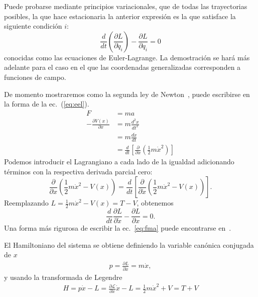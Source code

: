 Puede probarse mediante principios variacionales, que de todas las trayectorias posibles, la que hace  estacionaria la anterior expresi\'on es la que satisface la siguiente condici\'on $i$:
\begin{equation}
  \label{eq:eel}
 \frac{d}{dt} \left ( \frac{\partial L}{\partial\dot{q}_i} \right ) - \frac{\partial L}{\partial q_i} = 0
\end{equation}
conocidas como las ecuaciones de Euler-Lagrange. La demostraci\'on se
har\'a m\'as adelante para el caso en el que las coordenadas generalizadas
corresponden a funciones de campo. 

De momento mostraremos como la segunda ley de Newton~\cite{NewtonSeconLaw}, puede escribirse en la forma de la ec.~(\ref{eq:eel}).
\begin{align}
\label{eq:fma}
  F&=ma\\
  -\frac{\partial V(x)}{\partial x}&=m\frac{d^2x}{dt^2}\nonumber\\
  &=m\frac{d\dot{x}}{dt}\nonumber\\
  &=\frac{d}{dt}
  \left[
    \frac{\partial}{\partial\dot{x}}
    \left(
      \frac{1}{2}m\dot{x}^2
    \right)
  \right]\nonumber
\end{align}
Podemos introducir el Lagrangiano a cada lado de la igualdad adicionando t\'erminos con la respectiva derivada parcial cero:
\begin{equation*}
  \frac{\partial}{\partial x}
  \left(
\frac{1}{2}m\dot{x}^2-V(x)
  \right)=\frac{d}{dt}
  \left[
    \frac{\partial}{\partial\dot{x}}
    \left(
      \frac{1}{2}m\dot{x}^2-V(x)
    \right)
  \right].
\end{equation*}
Reemplazando $L=\frac{1}{2}m\dot{x}^2-V(x)=T-V$, obtenemos
\begin{equation*}
\frac{d}{dt}\frac{\partial L}{\partial\dot{x}}  -\frac{\partial L}{\partial x}=0.
\end{equation*}
Una forma m\'as rigurosa de escribir la ec.~\eqref{eq:fma} puede encontrarse en~\cite{ActionPhysics}. 

El Hamiltoniano del sistema se obtiene definiendo la variable can\'onica conjugada de $x$
\begin{align}
  p=\frac{\partial L}{\partial\dot{x}}=m \dot{x},
\end{align}
y usando la transformada de Legendre
\begin{align}
  H=p \dot{x}-L=\frac{\partial\mathcal{L}}{\partial\dot{x}}\dot{x}-L=\frac{1}{2}m\dot{x}^2+V=T+V
\end{align}

